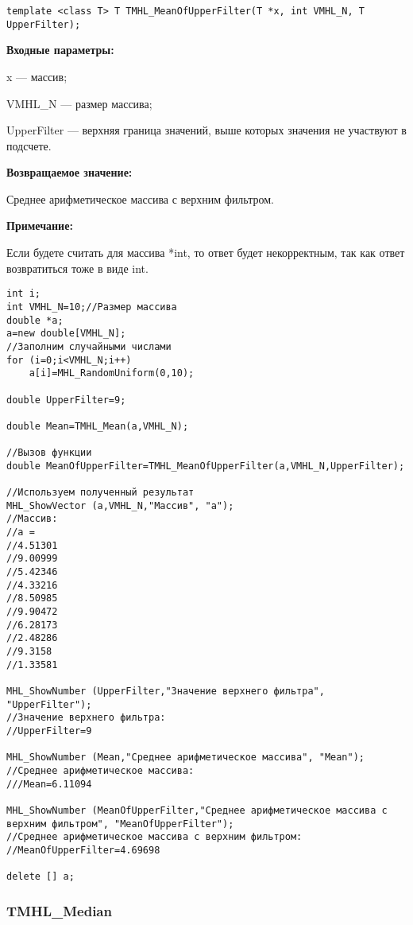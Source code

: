 \documentclass[a4paper,12pt]{article}
\begin{document}
\begin{lstlisting}[label=code_syntax_TMHL_MeanOfUpperFilter,caption=Синтаксис]
template <class T> T TMHL_MeanOfUpperFilter(T *x, int VMHL_N, T UpperFilter);
\end{lstlisting}

\textbf{Входные параметры:}

 x --- массив;
 
 VMHL\_N --- размер массива;
 
 UpperFilter --- верхняя граница значений, выше которых значения не участвуют в подсчете.

\textbf{Возвращаемое значение:}

 Среднее арифметическое массива с верхним фильтром.
 
\textbf{Примечание:}

Если будете считать для массива *int, то ответ будет некорректным, так как ответ возвратиться тоже в виде int.
 



\begin{lstlisting}[label=code_use_TMHL_MeanOfUpperFilter,caption=Пример использования]
int i;
int VMHL_N=10;//Размер массива
double *a;
a=new double[VMHL_N];
//Заполним случайными числами
for (i=0;i<VMHL_N;i++)
    a[i]=MHL_RandomUniform(0,10);

double UpperFilter=9;

double Mean=TMHL_Mean(a,VMHL_N);

//Вызов функции
double MeanOfUpperFilter=TMHL_MeanOfUpperFilter(a,VMHL_N,UpperFilter);

//Используем полученный результат
MHL_ShowVector (a,VMHL_N,"Массив", "a");
//Массив:
//a =
//4.51301
//9.00999
//5.42346
//4.33216
//8.50985
//9.90472
//6.28173
//2.48286
//9.3158
//1.33581

MHL_ShowNumber (UpperFilter,"Значение верхнего фильтра", "UpperFilter");
//Значение верхнего фильтра:
//UpperFilter=9

MHL_ShowNumber (Mean,"Среднее арифметическое массива", "Mean");
//Среднее арифметическое массива:
///Mean=6.11094

MHL_ShowNumber (MeanOfUpperFilter,"Среднее арифметическое массива с верхним фильтром", "MeanOfUpperFilter");
//Среднее арифметическое массива с верхним фильтром:
//MeanOfUpperFilter=4.69698

delete [] a;
\end{lstlisting}

\subsubsection{TMHL\_Median}\label{TMHL_Median}
\end{document}
